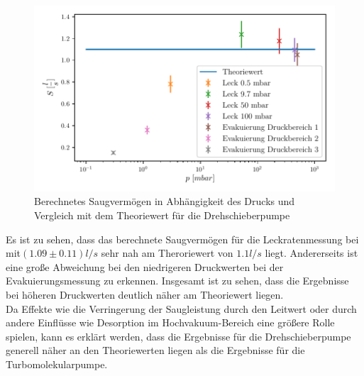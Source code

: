 \begin{figure}[H]
    \centering
    \includegraphics{build/plots/saug_dreh.pdf}
    \caption{Berechnetes Saugvermögen in Abhängigkeit des Drucks und Vergleich mit dem Theoriewert für die Drehschieberpumpe}
    \label{fig:plotds}
  \end{figure}
  \noindent
  Es ist zu sehen, dass das berechnete Saugvermögen für die Leckratenmessung bei  mit$(1.09 \pm 0.11) l/s$ sehr nah am Theroriewert von $1.1 l/s$ liegt. Andererseits ist eine große Abweichung bei den niedrigeren Druckwerten bei der Evakuierungsmessung zu erkennen. Insgesamt ist zu sehen, dass die Ergebnisse bei höheren Druckwerten deutlich näher am Theoriewert liegen. \\
  Da Effekte wie die Verringerung der Saugleistung durch den Leitwert oder durch andere Einflüsse wie Desorption im Hochvakuum-Bereich eine größere Rolle spielen, kann es erklärt werden, dass die Ergebnisse für die Drehschieberpumpe generell näher an den Theoriewerten liegen als die Ergebnisse für die Turbomolekularpumpe.   